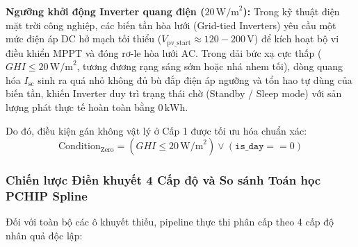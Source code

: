 \documentclass[12pt, a4paper]{report}
\begin{document}
\textbf{Ngưỡng khởi động Inverter quang điện ($20\,\text{W/m}^2$):}
Trong kỹ thuật điện mặt trời công nghiệp, các biến tần hòa lưới (Grid-tied Inverters) yêu cầu một mức điện áp DC hở mạch tối thiểu ($V_{\text{pv\_start}} \approx 120 - 200\,\text{V}$) để kích hoạt bộ vi điều khiển MPPT và đóng rơ-le hòa lưới AC. Trong dải bức xạ cực thấp ($GHI \le 20\,\text{W/m}^2$, tương đương rạng sáng sớm hoặc nhá nhem tối), dòng quang hóa $I_{\text{sc}}$ sinh ra quá nhỏ không đủ bù đắp điện áp ngưỡng và tổn hao tự dùng của biến tần, khiến Inverter duy trì trạng thái chờ (Standby / Sleep mode) với sản lượng phát thực tế hoàn toàn bằng $0\,\text{kWh}$.

Do đó, điều kiện gán không vật lý ở Cấp 1 được tối ưu hóa chuẩn xác:
\begin{equation}
\text{Condition}_{\text{Zero}} = (GHI \le 20\,\text{W/m}^2) \lor (\texttt{is\_day} == 0)
\end{equation}

\subsubsection{Chiến lược Điền khuyết 4 Cấp độ và So sánh Toán học PCHIP Spline}

Đối với toàn bộ các ô khuyết thiếu, pipeline thực thi phân cấp theo 4 cấp độ nhân quả độc lập:
\end{document}
